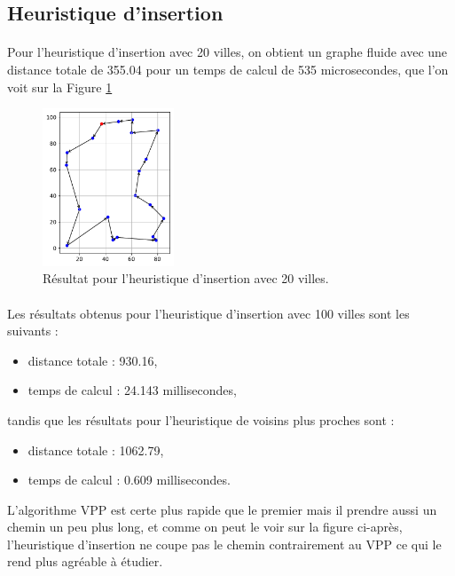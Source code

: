 \documentclass[a4paper,11pt,fleqn]{article}
\begin{document}
\subsection*{Heuristique d'insertion}
\paragraph{}
Pour l'heuristique d'insertion avec 20 villes, on obtient un graphe fluide avec une distance totale de 355.04 pour un temps de calcul de 535 microsecondes, que l'on voit sur la Figure \ref{fig:insert-20}
\begin{figure}[H]
    \centering
    \includegraphics[width=0.35\textwidth]{images/insertion_20_villes.pdf}
    \caption{Résultat pour l'heuristique d'insertion avec 20 villes.}
    \label{fig:insert-20}
\end{figure}
\paragraph{}

Les résultats obtenus pour l'heuristique d'insertion avec 100 villes sont les suivants :

\begin{itemize}[noitemsep,topsep=5pt]
    \item distance totale : 930.16,
    \item temps de calcul : 24.143 millisecondes,
\end{itemize}

tandis que les résultats pour l'heuristique de voisins plus proches sont :

\begin{itemize}[noitemsep,topsep=5pt]
    \item distance totale : 1062.79,
    \item temps de calcul : 0.609 millisecondes.
\end{itemize}

L'algorithme VPP est certe plus rapide que le premier mais il prendre aussi un chemin un peu plus long, et comme on peut le voir sur la figure ci-après, l'heuristique d'insertion ne coupe pas le chemin contrairement au VPP ce qui le rend plus agréable à étudier. 
\end{document}
